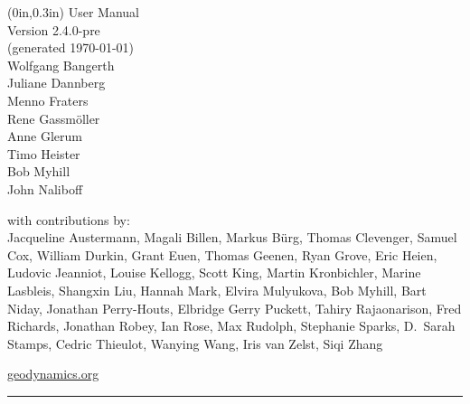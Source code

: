 \documentclass{article}
\begin{document}
{{  %
  \begin{textblock*}{\textwidth}(0in,0.3in)
    \vspace{1em}
    \color{dark_grey}
    \hfill{\Huge \fontfamily{\sfdefault}\selectfont User Manual \\
      \raggedleft \huge \fontfamily{\sfdefault}\selectfont Version
2.4.0-pre %
      \\
      \large(generated \today)
      \\[16pt]
        {\Large
          Wolfgang Bangerth \\
          Juliane Dannberg \\
          Menno Fraters \\
          Rene Gassm{\"o}ller \\
          Anne Glerum \\
          Timo Heister \\
          Bob Myhill \\
          John Naliboff\\}
    }
  \end{textblock*}
}


\null
\vfill
\color{dark_grey}
{\fontfamily{\sfdefault}\selectfont
\large
\noindent with contributions by: \\
    Jacqueline Austermann,
    Magali Billen,
    Markus B{\"u}rg,
    Thomas Clevenger,
    Samuel Cox,
    William Durkin,
    Grant Euen,
    Thomas Geenen,
    Ryan Grove,
    Eric Heien,
    Ludovic Jeanniot,
    Louise Kellogg,
    Scott King,
    Martin Kronbichler,
    Marine Lasbleis,
    Shangxin Liu,
    Hannah Mark,
    Elvira Mulyukova,
    Bob Myhill,
    Bart Niday,
    Jonathan Perry-Houts,
    Elbridge Gerry Puckett,
    Tahiry Rajaonarison,
    Fred Richards,
    Jonathan Robey,
    Ian Rose,
    Max Rudolph,
    Stephanie Sparks,
    D.~Sarah Stamps,
    Cedric Thieulot,
    Wanying Wang,
    Iris van Zelst,
    Siqi Zhang \\
\vspace{0.5em}
}

{\noindent
{\fontfamily{\sfdefault}\selectfont \href{https://geodynamics.org}{geodynamics.org}}
}

{\noindent
\color{dark_grey}
\rule{\textwidth}{2pt}
}

}
\end{document}
